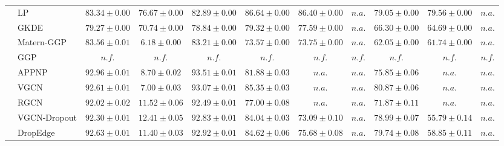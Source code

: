 \begin{table*}[!h]
{\begin{tabular}{ll|cc|cccc|ccc}
        \midrule
        
         & LP & ${83.34\scriptscriptstyle \pm 0.00}$ & ${76.67\scriptscriptstyle \pm 0.00}$ & ${82.89\scriptscriptstyle \pm 0.00}$ & ${{86.64}\scriptscriptstyle \pm 0.00}$ & ${86.40\scriptscriptstyle \pm 0.00}$ & $n.a.$ & ${79.05\scriptscriptstyle \pm 0.00}$ & ${79.56\scriptscriptstyle \pm 0.00}$ & $n.a.$\\
        & GKDE & ${79.27\scriptscriptstyle \pm 0.00}$ & ${70.74\scriptscriptstyle \pm 0.00}$ & ${78.84\scriptscriptstyle \pm 0.00}$ & ${79.32\scriptscriptstyle \pm 0.00}$ & ${77.59\scriptscriptstyle \pm 0.00}$ & $n.a.$ & ${66.30\scriptscriptstyle \pm 0.00}$ & ${64.69\scriptscriptstyle \pm 0.00}$ & $n.a.$\\
        & Matern-GGP & ${83.56\scriptscriptstyle \pm 0.01}$ & ${\mathbf{6.18}\scriptscriptstyle \pm 0.00}$ & ${83.21\scriptscriptstyle \pm 0.00}$ & ${73.57\scriptscriptstyle \pm 0.00}$ & ${73.75\scriptscriptstyle \pm 0.00}$ & $n.a.$ & ${62.05\scriptscriptstyle \pm 0.00}$ & ${61.74\scriptscriptstyle \pm 0.00}$ & $n.a.$\\
        & GGP & $n.f.$ & $n.f.$ & $n.f.$ & $n.f.$ & $n.f.$ & $n.f.$ & $n.f.$ & $n.f.$ & $n.f.$\\
        & APPNP & ${\mathbf{92.96}\scriptscriptstyle \pm 0.01}$ & ${8.70\scriptscriptstyle \pm 0.02}$ & ${\mathbf{93.51}\scriptscriptstyle \pm 0.01}$ & ${81.88\scriptscriptstyle \pm 0.03}$ & $n.a.$ & $n.a.$ & ${75.85\scriptscriptstyle \pm 0.06}$ & $n.a.$ & $n.a.$\\
        & VGCN & ${92.61\scriptscriptstyle \pm 0.01}$ & ${7.00\scriptscriptstyle \pm 0.03}$ & ${93.07\scriptscriptstyle \pm 0.01}$ & ${85.35\scriptscriptstyle \pm 0.03}$ & $n.a.$ & $n.a.$ & ${80.87\scriptscriptstyle \pm 0.06}$ & $n.a.$ & $n.a.$\\
        & RGCN & ${92.02\scriptscriptstyle \pm 0.02}$ & ${11.52\scriptscriptstyle \pm 0.06}$ & ${92.49\scriptscriptstyle \pm 0.01}$ & ${77.00\scriptscriptstyle \pm 0.08}$ & $n.a.$ & $n.a.$ & ${71.87\scriptscriptstyle \pm 0.11}$ & $n.a.$ & $n.a.$\\
        & VGCN-Dropout & ${92.30\scriptscriptstyle \pm 0.01}$ & ${12.41\scriptscriptstyle \pm 0.05}$ & ${92.83\scriptscriptstyle \pm 0.01}$ & ${84.04\scriptscriptstyle \pm 0.03}$ & ${73.09\scriptscriptstyle \pm 0.10}$ & $n.a.$ & ${78.99\scriptscriptstyle \pm 0.07}$ & ${55.79\scriptscriptstyle \pm 0.14}$ & $n.a.$\\
        & DropEdge & ${92.63\scriptscriptstyle \pm 0.01}$ & ${11.40\scriptscriptstyle \pm 0.03}$ & ${92.92\scriptscriptstyle \pm 0.01}$ & ${84.62\scriptscriptstyle \pm 0.06}$ & ${75.68\scriptscriptstyle \pm 0.08}$ & $n.a.$ & ${79.74\scriptscriptstyle \pm 0.08}$ & ${58.85\scriptscriptstyle \pm 0.11}$ & $n.a.$\\

\end{tabular}}
\end{table*}
